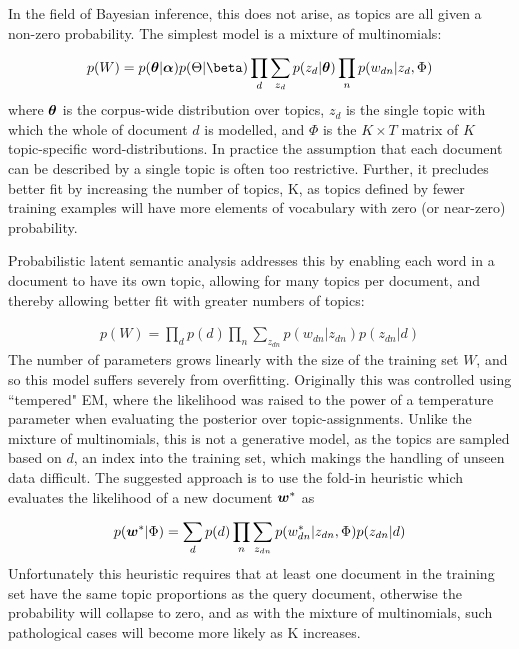 In the field of Bayesian inference, this does not arise, as topics are all given a non-zero probability. The simplest model is a mixture of multinomials\cite{Nigam2000}:

\begin{align}
p(W) = p(\vv{\theta}|\vv{\alpha})p(\Theta|\vv{\beta}) \prod_d \sum_{z_d} p(z_d|\vv{\theta})\prod_n p(w_{dn} | z_d, \Phi)
\end{align}
where $\bm \theta$ is the corpus-wide distribution over topics, $z_d$ is the single topic with which the whole of document $d$ is modelled, and $\Phi$ is the $K \times T$ matrix of $K$ topic-specific word-distributions. In practice the assumption that each document can be described by a single topic is often too restrictive. Further, it precludes better fit by increasing the number of topics, K, as topics defined by fewer training examples will have more elements of vocabulary with zero (or near-zero) probability.

Probabilistic latent semantic analysis\cite{Hofmann1999a} addresses this by enabling each word in a document to have its own topic, allowing for many topics per document, and thereby allowing better fit with greater numbers of topics:

\begin{align}
p(W) = \prod_d p(d) \prod_n \sum_{z_{dn}} p(w_{dn}|z_{dn})p(z_{dn}|d)
\end{align}
The number of parameters grows linearly with the size of the training set $W$, and so this model suffers severely from overfitting. Originally this was controlled using ``tempered" EM, where the likelihood was raised to the power of a temperature parameter when evaluating the posterior over topic-assignments. Unlike the mixture of multinomials, this is not a generative model, as the topics are sampled based on $d$, an index into the training set, which makings the handling of unseen data difficult. The suggested approach is to use the fold-in heuristic which evaluates the likelihood of a new document $\bm w^*$ as

\begin{align}
p(\bm w^*|\Phi) = \sum_d p(d) \prod_n \sum_{z_{dn}} p(w_{dn}^*|z_{dn}, \Phi) p(z_{dn}|d)
\end{align}
Unfortunately this heuristic requires that at least one document in the training set have the same topic proportions as the query document, otherwise the probability will collapse to zero, and as with the mixture of multinomials, such pathological cases will become more likely as K increases.


